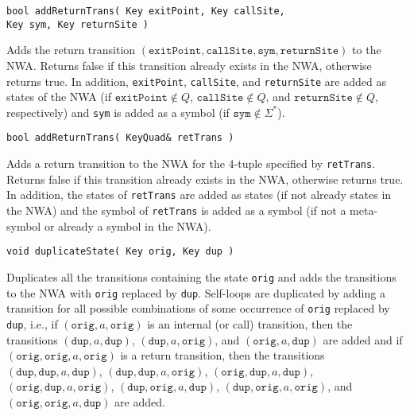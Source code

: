 \begin{description}
  \item\texttt{bool addReturnTrans( Key exitPoint, Key
    callSite,\\ \hspace*{3.25cm} Key sym, Key returnSite )} \nopagebreak

    Adds the return transition
    $(\texttt{exitPoint},\texttt{callSite},\texttt{sym},\texttt{returnSite})$
    to the NWA.  Returns false if this transition already exists in the NWA,
    otherwise returns true.  In addition, \texttt{exitPoint},
    \texttt{callSite}, and \texttt{returnSite} are added as states of the NWA
    (if $\texttt{exitPoint} \not\in Q$, $\texttt{callSite} \not\in Q$, and
    $\texttt{returnSite} \not\in Q$, respectively) and \texttt{sym} is added
    as a symbol (if $\texttt{sym} \not\in \Sigma^*$).

  \item\texttt{bool addReturnTrans( KeyQuad\& retTrans )} \nopagebreak

    Adds a return transition to the NWA for the 4-tuple specified by
    \texttt{retTrans}.  Returns false if this transition already exists in
    the NWA, otherwise returns true.  In addition, the states of
    \texttt{retTrans} are added as states (if not already states in the NWA)
    and the symbol of \texttt{retTrans} is added as a symbol (if not a
    meta-symbol or already a symbol in the NWA).

  \item\texttt{void duplicateState( Key orig, Key dup )} \nopagebreak

    Duplicates all the transitions containing the state \texttt{orig} and
    adds the transitions to the NWA with \texttt{orig} replaced by
    \texttt{dup}.  Self-loops are duplicated by adding a transition for all
    possible combinations of some occurrence of \texttt{orig} replaced by
    \texttt{dup}, i.e., if $(\texttt{orig},a,\texttt{orig})$ is an internal
    (or call) transition, then the transitions
    $(\texttt{dup},a,\texttt{dup})$, $(\texttt{dup},a,\texttt{orig})$, and
    $(\texttt{orig},a,\texttt{dup})$ are added and if
    $(\texttt{orig},\texttt{orig},a,\texttt{orig})$ is a return transition,
    then the transitions $(\texttt{dup},\texttt{dup},a,\texttt{dup})$,
    $(\texttt{dup},\texttt{dup},a,\texttt{orig})$,
    $(\texttt{orig},\texttt{dup},a,\texttt{dup})$,
    $(\texttt{orig},\texttt{dup},a,\texttt{orig})$,
    $(\texttt{dup},\texttt{orig},a,\texttt{dup})$,
    $(\texttt{dup},\texttt{orig},a,\texttt{orig})$, and
    $(\texttt{orig},\texttt{orig},a,\texttt{dup})$ are added.


\end{description}
